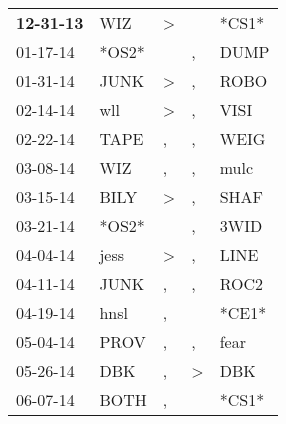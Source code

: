 \begin{supertabular}{p{0.07\textwidth}p{0.06\textwidth}p{0.02\textwidth}p{0.02\textwidth}p{0.06\textwidth}}
 \textbf{12-31-13\textsuperscript{}} &            WIZ\textsuperscript{} &     \textgreater &               &                   *CS1* \\
          01-17-14\textsuperscript{} &                            *OS2* &                  &             , &  DUMP\textsuperscript{} \\
          01-31-14\textsuperscript{} &           JUNK\textsuperscript{} &     \textgreater &             , &  ROBO\textsuperscript{} \\
          02-14-14\textsuperscript{} &            wll\textsuperscript{} &     \textgreater &             , &  VISI\textsuperscript{} \\
          02-22-14\textsuperscript{} &           TAPE\textsuperscript{} &                , &             , &  WEIG\textsuperscript{} \\
          03-08-14\textsuperscript{} &            WIZ\textsuperscript{} &                , &             , &  mulc\textsuperscript{} \\
          03-15-14\textsuperscript{} &           BILY\textsuperscript{} &     \textgreater &             , &  SHAF\textsuperscript{} \\
          03-21-14\textsuperscript{} &                            *OS2* &                  &             , &  3WID\textsuperscript{} \\
          04-04-14\textsuperscript{} &           jess\textsuperscript{} &     \textgreater &             , &  LINE\textsuperscript{} \\
          04-11-14\textsuperscript{} &           JUNK\textsuperscript{} &                , &             , &  ROC2\textsuperscript{} \\
          04-19-14\textsuperscript{} &           hnsl\textsuperscript{} &                , &               &                   *CE1* \\
          05-04-14\textsuperscript{} &           PROV\textsuperscript{} &                , &             , &  fear\textsuperscript{} \\
          05-26-14\textsuperscript{} &            DBK\textsuperscript{} &                , &  \textgreater &   DBK\textsuperscript{} \\
          06-07-14\textsuperscript{} &           BOTH\textsuperscript{} &                , &               &                   *CS1* \\

\end{supertabular}
